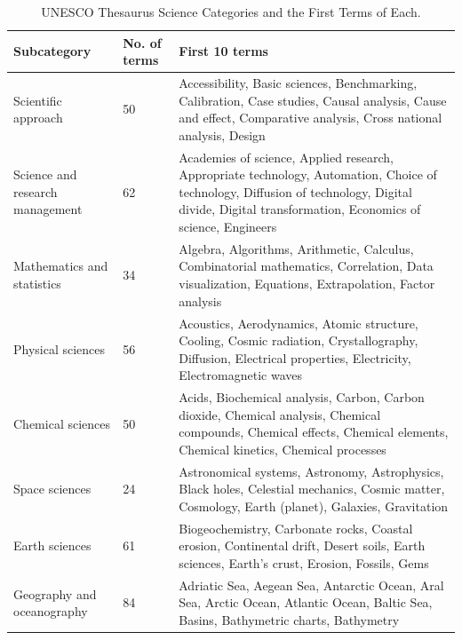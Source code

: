 \documentclass[pdflatex,sn-mathphys-num, iicol]{sn-jnl}
\begin{document}
\begin{table}[t]
	\centering
	\footnotesize
	\caption{UNESCO Thesaurus Science Categories and the First Terms of Each.}
	\label{tab:categorias_ciencia}
	
	\begin{tabular}{@{}p{3.5cm}p{2cm}p{8.5cm}@{}}
		\toprule
		\textbf{Subcategory} & \textbf{No. of terms} & \textbf{First 10 terms} \\
		\midrule
		
		Scientific approach & 50 & Accessibility, Basic sciences, Benchmarking, Calibration, Case studies, Causal analysis, Cause and effect, Comparative analysis, Cross national analysis, Design \\
		
		Science and research management & 62 & Academies of science, Applied research, Appropriate technology, Automation, Choice of technology, Diffusion of technology, Digital divide, Digital transformation, Economics of science, Engineers \\
		
		Mathematics and statistics & 34 & Algebra, Algorithms, Arithmetic, Calculus, Combinatorial mathematics, Correlation, Data visualization, Equations, Extrapolation, Factor analysis \\
		
		Physical sciences & 56 & Acoustics, Aerodynamics, Atomic structure, Cooling, Cosmic radiation, Crystallography, Diffusion, Electrical properties, Electricity, Electromagnetic waves \\
		
		Chemical sciences & 50 & Acids, Biochemical analysis, Carbon, Carbon dioxide, Chemical analysis, Chemical compounds, Chemical effects, Chemical elements, Chemical kinetics, Chemical processes \\
		
		Space sciences & 24 & Astronomical systems, Astronomy, Astrophysics, Black holes, Celestial mechanics, Cosmic matter, Cosmology, Earth (planet), Galaxies, Gravitation \\
		
		Earth sciences & 61 & Biogeochemistry, Carbonate rocks, Coastal erosion, Continental drift, Desert soils, Earth sciences, Earth's crust, Erosion, Fossils, Gems \\
		
		Geography and oceanography & 84 & Adriatic Sea, Aegean Sea, Antarctic Ocean, Aral Sea, Arctic Ocean, Atlantic Ocean, Baltic Sea, Basins, Bathymetric charts, Bathymetry \\
		

\end{tabular}
\end{table}
\end{document}
